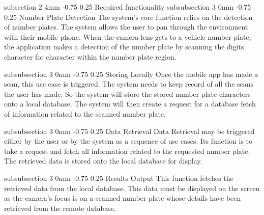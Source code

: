 \documentclass[12pt]{article}
\makeatletter
\renewcommand{\subsection}{\@startsection
   {subsection}%
   {2}%
   {4mm}%
   {-0.75\baselineskip}%
   {0.25\baselineskip}%
   {\rmfamily\normalfont\scshape\normalsize}}%
\renewcommand{\subsubsection}{\@startsection
   {subsubsection}%
   {3}%
   {0mm}%
   {-0.75\baselineskip}%
   {0.25\baselineskip}%
   {\rmfamily\normalfont\slshape\normalsize}}%
\makeatother
\begin{document}
                    \subsection{Required functionality}
                    		\subsubsection{Number Plate Detection}
                    				The system's core function relies on the detection of number plates. The system allows the user to pan through the environment with their mobile phone. When the camera lens gets to a vehicle number plate, the application makes a detection of the number plate by scanning the digits character for character within the number plate region.
                    			
                    			
                    		\subsubsection{Storing Locally}
                    				Once the mobile app has made a scan, this use case is triggered. The system needs to keep record of all the scans the user has made. So the system will store the stored number plate characters onto a local database. The system will then create a request for a database fetch of information related to the scanned number plate.
                    		
                    		\subsubsection{Data Retrieval}
                    				Data Retrieval may be triggered either by the user or by the system as a sequence of use cases. Its function is to take a request and fetch all information related to the requested number plate. The retrieved data is stored onto the local database for display.
                    		
                    		\subsubsection{Results Output}
                    				This function fetches the retrieved data from the local database. This data must be displayed on the screen as the camera's focus is on a scanned number plate whose details have been retrieved from the remote database. 
                    				
                    				
\end{document}
